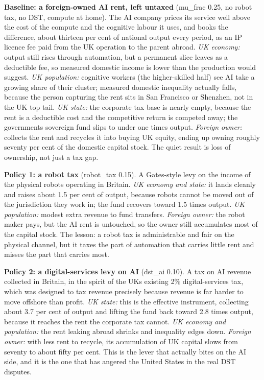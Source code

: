 \documentclass[11pt]{article}
\begin{document}
\textbf{Baseline: a foreign-owned AI rent, left untaxed} (mu\_frac 0.25,
no robot tax, no DST, compute at home). The AI company prices its
service well above the cost of the compute and the cognitive labour it
uses, and books the difference, about thirteen per cent of national
output every period, as an IP licence fee paid from the UK operation to
the parent abroad. \emph{UK economy:} output still rises through
automation, but a permanent slice leaves as a deductible fee, so
measured domestic income is lower than the production would suggest.
\emph{UK population:} cognitive workers (the higher-skilled half) see AI
take a growing share of their cluster; measured domestic inequality
actually falls, because the person capturing the rent sits in San
Francisco or Shenzhen, not in the UK top tail. \emph{UK state:} the
corporate tax base is nearly empty, because the rent is a deductible
cost and the competitive return is competed away; the
government\textquotesingle s sovereign fund slips to under one times
output. \emph{Foreign owner:} collects the rent and recycles it into
buying UK equity, ending up owning roughly seventy per cent of the
domestic capital stock. The quiet result is loss of ownership, not just
a tax gap.

\textbf{Policy 1: a robot tax} (robot\_tax 0.15). A Gates-style levy on
the income of the physical robots operating in Britain. \emph{UK economy
and state:} it lands cleanly and raises about 1.5 per cent of output,
because robots cannot be moved out of the jurisdiction they work in; the
fund recovers toward 1.5 times output. \emph{UK population:} modest
extra revenue to fund transfers. \emph{Foreign owner:} the robot maker
pays, but the AI rent is untouched, so the owner still accumulates most
of the capital stock. The lesson: a robot tax is administrable and fair
on the physical channel, but it taxes the part of automation that
carries little rent and misses the part that carries most.

\textbf{Policy 2: a digital-services levy on AI} (dst\_ai 0.10). A tax
on AI revenue collected in Britain, in the spirit of the
UK\textquotesingle s existing 2\% digital-services tax, which was
designed to tax revenue precisely because revenue is far harder to move
offshore than profit. \emph{UK state:} this is the effective instrument,
collecting about 3.7 per cent of output and lifting the fund back toward
2.8 times output, because it reaches the rent the corporate tax cannot.
\emph{UK economy and population:} the rent leaking abroad shrinks and
inequality edges down. \emph{Foreign owner:} with less rent to recycle,
its accumulation of UK capital slows from seventy to about fifty per
cent. This is the lever that actually bites on the AI side, and it is
the one that has angered the United States in the real DST disputes.
\end{document}
